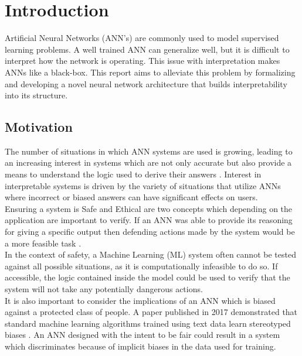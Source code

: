 \chapter{Introduction}\label{C:intro}

Artificial Neural Networks (ANN's) are commonly used to model supervised learning problems. A well trained ANN can generalize well, but it is difficult to interpret how the network is operating. This issue with interpretation makes ANNs like a black-box. This report aims to alleviate this problem by formalizing and developing a novel neural network architecture that builds interpretability into its structure.

\section{Motivation}
The number of situations in which ANN systems are used is growing, leading to an increasing interest in systems which are not only accurate but also provide a means to understand the logic used to derive their answers \cite{doshi2017towards}. Interest in interpretable systems is driven by the variety of situations that utilize ANNs where incorrect or biased answers can have significant effects on users.\\

Ensuring a system is Safe and Ethical are two concepts which depending on the application are important to verify. If an ANN was able to provide its reasoning for giving a specific output then defending actions made by the system would be a more feasible task \cite{doshi2017towards}.\\

In the context of safety, a Machine Learning (ML) system often cannot be tested against all possible situations, as it is computationally infeasible to do so. If accessible, the logic contained inside the model could be used to verify that the system will not take any potentially dangerous actions.\\

It is also important to consider the implications of an ANN which is biased against a protected class of people. A paper published in 2017 demonstrated that standard machine learning algorithms trained using text data learn stereotyped biases \cite{caliskan2017semantics}. An ANN designed with the intent to be fair could result in a system which discriminates because of implicit biases in the data used for training.\\

